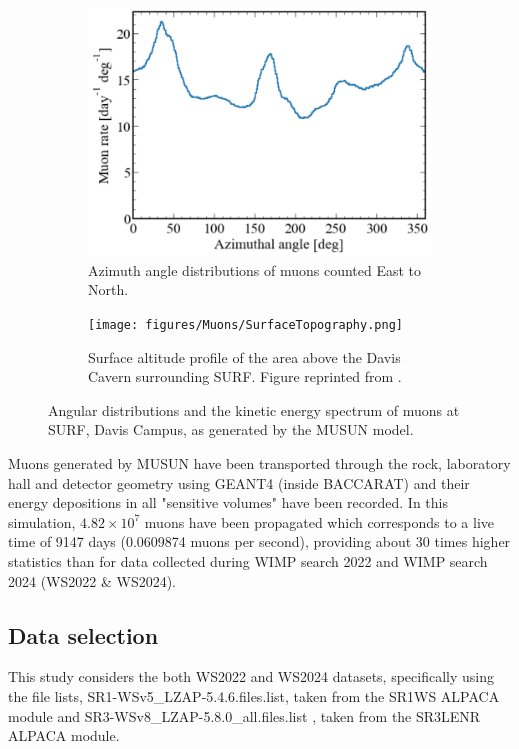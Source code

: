\begin{figure}[htbp]
\begin{subfigure}[b]{0.49\textwidth}
        \centering 
        \includegraphics[width=\textwidth]{figures/Muons/Azimuthal.pdf}
        \caption{Azimuth angle distributions of muons counted East to North.}
        \label{fig:azi}
    \end{subfigure}
    \begin{subfigure}[b]{0.49\textwidth}   
        \centering 
        \texttt{[image: figures/Muons/SurfaceTopography.png]}
        \caption{Surface altitude profile of the area above the Davis Cavern surrounding SURF. Figure reprinted from \cite{dwoodward:thesis}.} 
        \label{Azi_vs_Zen}
    \end{subfigure}
    \caption{Angular distributions and the kinetic energy spectrum of muons at SURF, Davis Campus, as generated by the MUSUN model.} 
    \label{Prime_info}
\end{figure}
\par Muons generated by MUSUN have been transported through the rock, laboratory hall and detector geometry using GEANT4 (inside BACCARAT) and their energy depositions in all "sensitive volumes" have been recorded. In this simulation, $4.82\times10^7$ muons have been propagated which corresponds to a live time of 9147 days (0.0609874 muons per second), providing about 30 times higher statistics than for data collected during WIMP search 2022 and WIMP search 2024 (WS2022 \& WS2024).

\subsection{Data selection}
This study considers the both WS2022 and WS2024 datasets, specifically using the file lists, {\selectfont SR1-WSv5\_LZAP-5.4.6.files.list}, taken from the {\selectfont SR1WS} ALPACA module and {\selectfont SR3-WSv8\_LZAP-5.8.0\_all.files.list }, taken from the {\selectfont SR3LENR} ALPACA module. 

